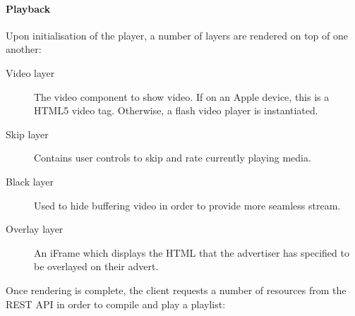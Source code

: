 \paragraph{Playback}

Upon initialisation of the player, a number of layers are rendered on top of one another:

\begin{description}
	\item[Video layer] The video component to show video. If on an Apple device, this is a HTML5 video tag. Otherwise, a flash video player is instantiated.
	\item[Skip layer] Contains user controls to skip and rate currently playing media.
	\item[Black layer] Used to hide buffering video in order to provide more seamless stream.
	\item[Overlay layer] An iFrame which displays the HTML that the advertiser has specified to be overlayed on their advert.
\end{description}

Once rendering is complete, the client requests a number of resources from the REST API in order to compile and play a playlist:

